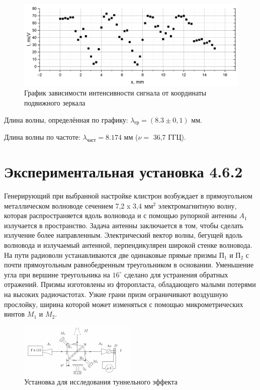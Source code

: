 \documentclass[a4paper,12pt]{article} %
\begin{document}
\begin{figure}[h]
    \centering
    \includegraphics[width=14cm]{graph1.PNG}
    \caption{График зависимости интенсивности сигнала от координаты подвижного зеркала}
    \label{fig:vac}
\end{figure}

\noindent Длина волны, определённая по графику: $\lambda_\text{гр} = (8.3 \pm 0,1 )$ мм. \par

\medskip

\noindent Длина волны по частоте: $\lambda_\text{част} = 8.174$ мм ($\nu = $ 36,7 ГГЦ).

\section{Экспериментальная установка 4.6.2}

\noindent Генерирующий при выбранной настройке клистрон возбуждает в прямоугольном металлическом волноводе сечением 7,2 x 3,4 $\text{мм}^2$ электромагнитную волну, которая распространяется вдоль волновода и с помощью рупорной антенны $A_1$ излучается в пространство. Задача антенны заключается в том, чтобы сделать излучение более направленным. Электрический вектор волны, бегущей вдоль волновода и излучаемый антенной, перпендикулярен широкой стенке волновода. На пути радиоволн устанавливаются две одинаковые прямые призмы $\text{П}_1$ и $\text{П}_2$ с почти прямоугольным равнобедренным треугольником в основании. Уменьшение угла при вершине треугольника на $16^\circ$ сделано для устранения обратных отражений. Призмы изготовлены из фторопласта, обладающего малыми потерями на высоких радиочастотах. Узкие грани призм ограничивают воздушную прослойку, ширина которой может изменяться с помощью микрометрических винтов $M_1$ и $M_2$.
\begin{figure}
\begin{center}
\includegraphics[width=0.5\textwidth]{tunnelteor}
\caption{Установка для исследования туннельного эффекта}
\end{center}

\end{figure}
\end{document}
